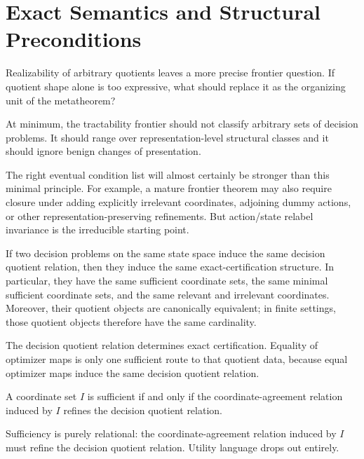 \section{Exact Semantics and Structural Preconditions}\label{sec:exact-semantics-foundation}

Realizability of arbitrary quotients leaves a more precise frontier question. If quotient shape alone is too expressive, what should replace it as the organizing unit of the metatheorem?

At minimum, the tractability frontier should not classify arbitrary sets of decision problems. It should range over representation-level structural classes and it should ignore benign changes of presentation.

The right eventual condition list will almost certainly be stronger than this minimal principle. For example, a mature frontier theorem may also require closure under adding explicitly irrelevant coordinates, adjoining dummy actions, or other representation-preserving refinements. But action/state relabel invariance is the irreducible starting point.

\begin{proposition}\label{prop:depends-only-on-opt}
If two decision problems on the same state space induce the same decision quotient relation, then they induce the same exact-certification structure. In particular, they have the same sufficient coordinate sets, the same minimal sufficient coordinate sets, and the same relevant and irrelevant coordinates. Moreover, their quotient objects are canonically equivalent; in finite settings, those quotient objects therefore have the same cardinality.
\end{proposition}

The decision quotient relation determines exact certification. Equality of optimizer maps is only one sufficient route to that quotient data, because equal optimizer maps induce the same decision quotient relation.

\begin{corollary}\label{cor:sufficiency-refinement}
A coordinate set $I$ is sufficient if and only if the coordinate-agreement relation induced by $I$ refines the decision quotient relation.
\end{corollary}

Sufficiency is purely relational: the coordinate-agreement relation induced by $I$ must refine the decision quotient relation. Utility language drops out entirely.

